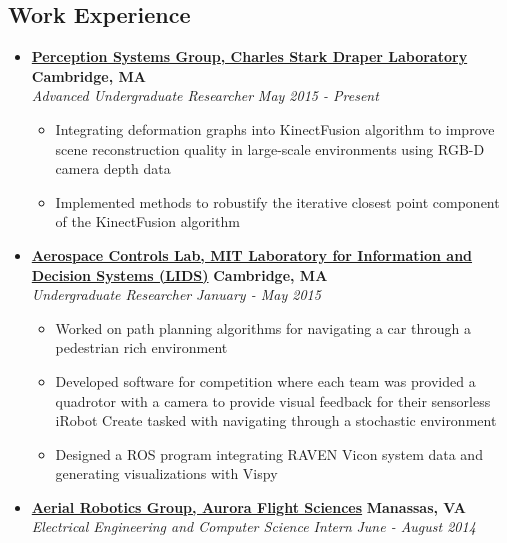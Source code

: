 \documentclass[10pt,letterpaper]{article}
\begin{document}
\subsection*{Work Experience}
  \begin{itemize}
    \parskip=-0.1em

    \item[]
    {\href{http://draper.com/}{\textbf{Perception Systems Group, Charles Stark Draper Laboratory}} \hfill
      \textbf{Cambridge, MA}}
    \\
    {\emph{Advanced Undergraduate Researcher} \hfill \emph{May 2015 - Present}}
	
	\begin{itemize}[label=\textbullet]
	\itemsep0em 
	\item Integrating deformation graphs into KinectFusion algorithm to improve scene reconstruction quality in large-scale environments using RGB-D camera depth data
	\item Implemented methods to robustify the iterative closest point component of the KinectFusion algorithm 
	
\end{itemize}

    \item[]
    {\href{http://acl.mit.edu/}{\textbf{Aerospace Controls Lab, MIT Laboratory for Information and Decision Systems (LIDS)}} \hfill
      \textbf{Cambridge, MA}}
    \\
    {\emph{Undergraduate Researcher} \hfill \emph{January - May 2015}}
	
	\begin{itemize}[label=\textbullet]
	\itemsep0em 
	\item Worked on path planning algorithms for navigating a car through a pedestrian rich environment
	\item Developed software for competition where each team was provided a quadrotor with a camera to provide visual feedback for their sensorless iRobot Create tasked with navigating through a stochastic environment
	\item Designed a ROS program integrating RAVEN Vicon system data and generating visualizations with Vispy
	
\end{itemize}

    \item[]
    {\href{http://aurora.aero}{\textbf{Aerial Robotics Group, Aurora Flight Sciences}} \hfill
      \textbf{Manassas, VA}}
    \\
    {\emph{Electrical Engineering and Computer Science Intern} \hfill \emph{June - August 2014}}
	

\end{itemize}
\end{document}
